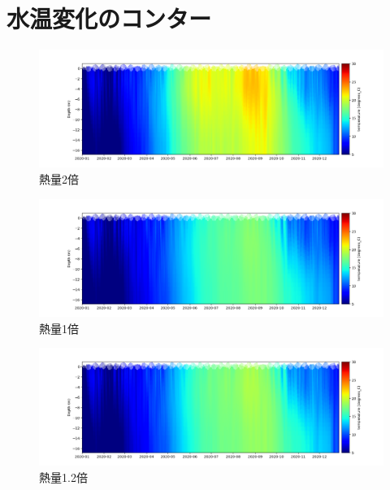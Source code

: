 \documentclass[12pt,a4paper]{jarticle}
\begin{document}
\section{水温変化のコンター}
\begin{figure}[hbtp]
    \includegraphics[keepaspectratio,width=180mm]{contour/Tokyo3_chiba1buoy.png}
    \caption{熱量2倍}
\end{figure}

\begin{figure}[hbtp]
    \centering
        \includegraphics[keepaspectratio,scale=0.5]{contour/Tokyo4_chiba1buoy.png}
    \caption{熱量1倍}
\end{figure}

\begin{figure}[hbtp]
    \centering
        \includegraphics[keepaspectratio,scale=0.5]{contour/Tokyo5_chiba1buoy.png}
    \caption{熱量1.2倍}
\end{figure}

\newpage
\end{document}

